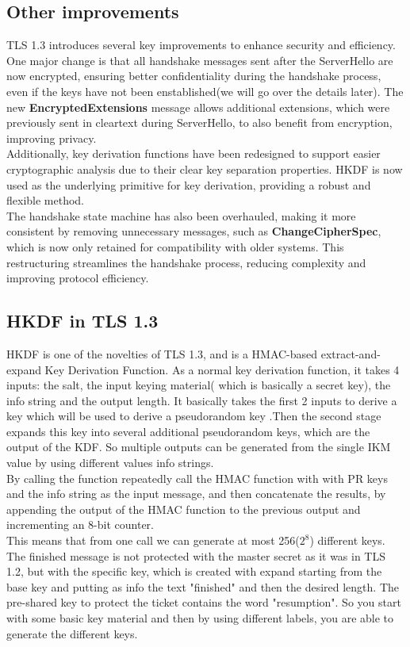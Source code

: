 \subsection{Other improvements}
TLS 1.3 introduces several key improvements to enhance security and
efficiency. One major change is that all handshake messages sent after
the ServerHello are now encrypted, ensuring better confidentiality
during the handshake process, even if the keys have not been
enstablished(we will go over the details later). The new
\textbf{EncryptedExtensions} message allows additional extensions,
which were previously sent in cleartext during ServerHello, to also
benefit from encryption, improving privacy.\\
Additionally, key derivation functions have been redesigned to support
easier cryptographic analysis due to their clear key separation
properties. HKDF is now used as the underlying primitive for key
derivation, providing a robust and flexible method.\\
The handshake state machine has also been overhauled, making it more
consistent by removing unnecessary messages, such as
\textbf{ChangeCipherSpec}, which is now only retained for
compatibility with older systems. This restructuring streamlines the
handshake process, reducing complexity and improving protocol
efficiency.


\subsection{HKDF in TLS 1.3}
HKDF is one of the novelties of TLS 1.3, and is a HMAC-based
extract-and-expand Key Derivation Function. As a normal key derivation
function, it takes 4 inputs: the salt, the input keying material(
which is basically a secret key), the info string and the output
length. It basically takes the first 2 inputs to derive a key which
will be used to derive a pseudorandom key .Then the second stage
expands this key into several additional pseudorandom keys, which are
the output of the KDF. So multiple outputs can be generated from the
single IKM value by using different values info strings.\\
By calling the function repeatedly call the HMAC function with with PR
keys and the info string as the input message, and then concatenate 
the results, by appending the output of the HMAC function to the 
previous output and incrementing an 8-bit counter.\\
This means that from one call we can generate at most 256($2^8$)
different keys.\\
The finished message is not protected with the master secret as it was
in TLS 1.2, but with the specific key, which is created with expand
starting from the base key and putting as info the text "finished" and
then the desired length. The pre-shared key to protect the ticket
contains the word "resumption". So you start with some basic key
material and then by using different labels, you are able to generate
the different keys.

